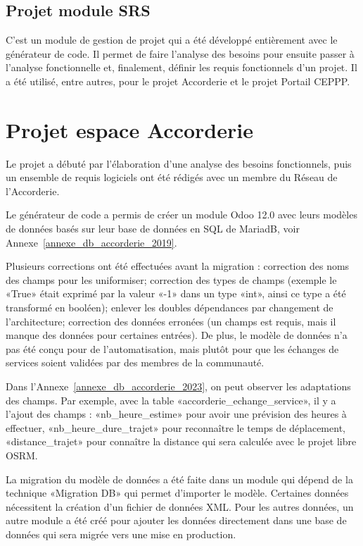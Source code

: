 \subsection{Projet module SRS}

C’est un module de gestion de projet qui a été développé entièrement avec le générateur de code. Il permet de faire l’analyse des besoins pour ensuite passer à l’analyse fonctionnelle et, finalement, définir les requis fonctionnels d’un projet. Il a été utilisé, entre autres, pour le projet Accorderie et le projet Portail CEPPP.

\section{Projet espace Accorderie}

Le projet a débuté par l'élaboration d'une analyse des besoins fonctionnels, puis un ensemble de requis logiciels ont été rédigés avec un membre du Réseau de l'Accorderie. %

Le générateur de code a permis de créer un module Odoo 12.0 avec leurs modèles de données basés sur leur base de données en SQL de MariadB, voir Annexe~\ref{annexe_db_accorderie_2019}.

Plusieurs corrections ont été effectuées avant la migration : correction des noms des champs pour les uniformiser; correction des types de champs (exemple le «True» était exprimé par la valeur «-1» dans un type «int», ainsi ce type a été transformé en booléen); enlever les doubles dépendances par changement de l’architecture; correction des données erronées (un champs est requis, mais il manque des données pour certaines entrées). De plus, le modèle de données n’a pas été conçu pour de l’automatisation, mais plutôt pour que les échanges de services soient validées par des membres de la communauté.

Dans l'Annexe~\ref{annexe_db_accorderie_2023}, on peut observer les adaptations des champs. Par exemple, avec la table «accorderie\_echange\_service», il y a l'ajout des champs : «nb\_heure\_estime» pour avoir une prévision des heures à effectuer, «nb\_heure\_dure\_trajet» pour reconnaître le temps de déplacement, «distance\_trajet» pour connaître la distance qui sera calculée avec le projet libre OSRM.

La migration du modèle de données a été faite dans un module qui dépend de la technique «Migration DB» qui permet d'importer le modèle. Certaines données nécessitent la création d’un fichier de données XML. Pour les autres données, un autre module a été créé pour ajouter les données directement dans une base de données qui sera migrée vers une mise en production.

